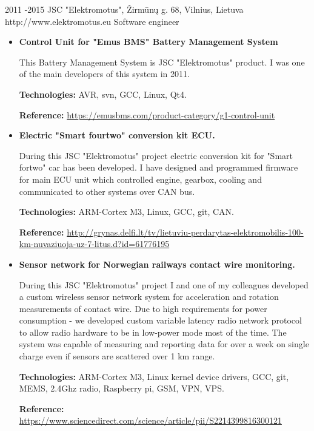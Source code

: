 \documentclass[12]{article}
\begin{document}
\job
{2011 -}{2015}
{JSC "Elektromotus", Žirmūnų g. 68, Vilnius, Lietuva}
{http://www.elektromotus.eu}
{Software engineer}
{}
\begin{itemize}[leftmargin=2cm,topsep=-0.5cm]

\item \textbf{Control Unit for "Emus BMS" Battery Management System}

This Battery Management System is JSC "Elektromotus" product.
I was one of the main developers of this system in 2011.

\rule{0mm}{5mm}\textbf{Technologies:} AVR, svn, GCC, Linux, Qt4.

\rule{0mm}{5mm}\textbf{Reference:} \url{https://emusbms.com/product-category/g1-control-unit}

\item \textbf{Electric "Smart fourtwo" conversion kit ECU.}

During this JSC "Elektromotus" project electric conversion kit for "Smart fortwo" car has been developed.
I have designed and programmed firmware for main ECU unit which controlled engine, gearbox, cooling and communicated to other systems over CAN bus.

\rule{0mm}{5mm}\textbf{Technologies:} ARM-Cortex M3, Linux, GCC, git, CAN.

\rule{0mm}{5mm}\textbf{Reference:} \url{http://grynas.delfi.lt/tv/lietuviu-perdarytas-elektromobilis-100-km-nuvaziuoja-uz-7-litus.d?id=61776195}

\item \textbf{Sensor network for Norwegian railways contact wire monitoring.}

During this JSC "Elektromotus" project I and one of my colleagues developed a custom wireless sensor network system for acceleration and rotation measurements of contact wire.
Due to high requirements for power consumption - we developed custom variable latency radio network protocol to allow radio hardware to be in low-power mode most of the time.
The system was capable of measuring and reporting data for over a week on single charge even if sensors are scattered over 1 km range.

\rule{0mm}{5mm}\textbf{Technologies:} ARM-Cortex M3, Linux kernel device drivers, GCC, git, MEMS, 2.4Ghz radio, Raspberry pi, GSM, VPN, VPS.

\rule{0mm}{5mm}\textbf{Reference:} \url{https://www.sciencedirect.com/science/article/pii/S2214399816300121}\\

\end{itemize}
\end{document}
